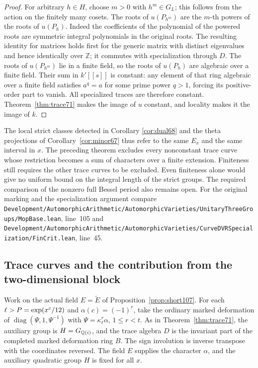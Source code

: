 \documentclass[a4paper,11pt]{article}
\theoremstyle{definition}
\theoremstyle{remark}
\newcommand{\ZZ}{\mathbb Z}\newcommand{\ord}{\operatorname{ord}}
\newcommand{\srcloc}[2]{{\small\nolinkurl{#1.lean}}, line~#2}
\numberwithin{equation}{section}
\begin{document}
\begin{proof}
For arbitrary \(h\in H\), choose \(m>0\) with \(h^m\in G_L\);
this follows from the action on the finitely many cosets.
The roots of \(u(P_{h^m})\) are the \(m\)-th powers of the
roots of \(u(P_h)\). Indeed the coefficients of the polynomial
of the powered roots are symmetric integral polynomials in the
original roots. The resulting identity for matrices holds first
for the generic matrix with distinct eigenvalues and hence
identically over \(\ZZ\); it commutes with specialization
through \(D\). The roots of \(u(P_{h^m})\) lie in a finite
field, so the roots of \(u(P_h)\) are algebraic over a finite
field. Their sum in \(k'[[s]]\) is constant: any element of
that ring algebraic over a finite field satisfies
\(a^{q}=a\) for some prime power \(q>1\), forcing its
positive-order part to vanish. All specialized traces are
therefore constant. Theorem~\ref{thm:trace71} makes the image
of \(u\) constant, and locality makes it the image of \(k\).
\end{proof}

The local strict classes detected in
Corollary \ref{cor:dual68}
and the theta projections of Corollary~\ref{cor:minor67} thus
refer to the same \(E_x\) and the same interval in \(x\).
The preceding theorem excludes every nonconstant trace curve
whose restriction becomes a sum of characters over a finite
extension. Finiteness still requires the other trace curves to
be excluded. Even finiteness alone would give no uniform bound
on the integral length of the strict groups. The required
comparison of the nonzero full Bessel period also remains open.
For the original marking and the specialization argument compare
\srcloc{Development/AutomorphicArithmetic/AutomorphicVarieties/UnitaryThreeGroups/MopBase}{105}
and
\srcloc{Development/AutomorphicArithmetic/AutomorphicVarieties/CurveDVRSpecialization/FinCrit}{45}.

\subsection{Trace curves and the contribution from the two-dimensional block}\label{nav:IV-26}
Work on the actual field \(E=\widetilde E\) of
Proposition~\ref{prop:short107}. For each \(\ell>P=\exp(x^\varepsilon/12)\)
and \(\alpha(c)=(-1)^r\), take the ordinary marked deformation of
\(\operatorname{diag}(\Psi,1,\Psi^{-1})\) with
\(\Psi=\kappa_\ell^r\alpha\), \(1\le r<t\). As in
Theorem~\ref{thm:trace71}, the auxiliary group is
\(H=G_{\mathbb Q(i)}\), and the trace algebra \(D\) is the invariant
part of the completed marked deformation ring \(B\).
The sign involution is inverse transpose with the coordinates
reversed. The field \(E\) supplies the character \(\alpha\), and
the auxiliary quadratic group \(H\) is fixed for all \(x\).
\end{document}
